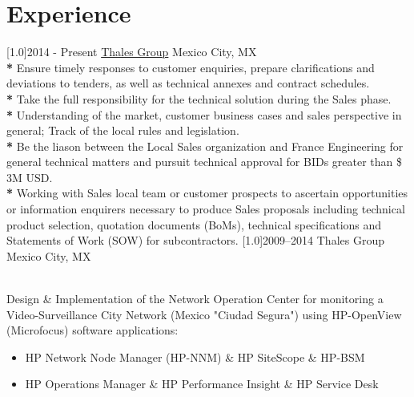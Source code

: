 \documentclass[espanol]{cv-style}     %
\begin{document}
\section{Experience}
  \vspace{-0.2cm}
\begin{entrylist}
\entry
  {\scalebox{.8}[1.0]{2014 - Present}}
  {\href{https://www.thalesgroup.com/es/americas/thales-mexico}{Thales Group}}
  {Mexico City, MX}
  {\\
\textbf{*} Ensure timely responses to customer enquiries, prepare clarifications and deviations to tenders, as well as technical annexes and contract schedules.\\
\textbf{*} Take the full responsibility for the technical solution during the Sales phase.\\
\textbf{*} Understanding of the market, customer business cases and sales perspective in general; Track of the local rules and legislation.\\
\textbf{*} Be the liason between the Local Sales organization and France Engineering for general technical matters and pursuit  technical approval for BIDs greater than \$ 3M USD.\\
\textbf{*} Working with Sales local team or customer prospects to ascertain opportunities or information enquirers necessary to produce Sales proposals including technical product selection, quotation documents (BoMs), technical specifications and Statements of Work (SOW) for subcontractors.
}
\vspace{-0.3cm}
\entry
  {\scalebox{.8}[1.0]{2009--2014}}
  {Thales Group}
  {Mexico City, MX}
  {\\
Design \& Implementation of the Network Operation Center for monitoring a  Video-Surveillance City Network (Mexico "Ciudad Segura")
using HP-OpenView (Microfocus) software applications:
  \begin{itemize}
    \item HP Network Node Manager (HP-NNM) \& HP SiteScope \& HP-BSM
\item HP Operations Manager \& HP Performance Insight \& HP Service Desk\\
  \end{itemize}
  }
\vspace{-0.3cm}

\end{entrylist}
\end{document}
